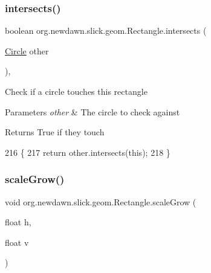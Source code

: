 \subsubsection{\texorpdfstring{intersects()}{intersects()}\hspace{0.1cm}{\footnotesize\ttfamily [2/2]}}
{\footnotesize\ttfamily boolean org.\+newdawn.\+slick.\+geom.\+Rectangle.\+intersects (\begin{DoxyParamCaption}\item[{\mbox{\hyperlink{classorg_1_1newdawn_1_1slick_1_1geom_1_1_circle}{Circle}}}]{other }\end{DoxyParamCaption})\hspace{0.3cm}{\ttfamily [inline]}, {\ttfamily [private]}}

Check if a circle touches this rectangle


\begin{DoxyParams}{Parameters}
{\em other} & The circle to check against \\
\hline
\end{DoxyParams}
\begin{DoxyReturn}{Returns}
True if they touch 
\end{DoxyReturn}

\begin{DoxyCode}
216                                              \{
217         \textcolor{keywordflow}{return} other.intersects(\textcolor{keyword}{this});
218     \}
\end{DoxyCode}
\mbox{\label{classorg_1_1newdawn_1_1slick_1_1geom_1_1_rectangle_af4d484d7d6083833ff7e793279000502}} 
\subsubsection{\texorpdfstring{scale\+Grow()}{scaleGrow()}}
{\footnotesize\ttfamily void org.\+newdawn.\+slick.\+geom.\+Rectangle.\+scale\+Grow (\begin{DoxyParamCaption}\item[{float}]{h,  }\item[{float}]{v }\end{DoxyParamCaption})\hspace{0.3cm}{\ttfamily [inline]}}

